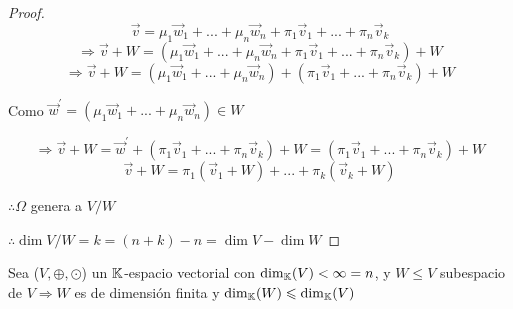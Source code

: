 \begin{proof}
    $$\vec{v} =  {\mu}_{1}\vec{w}_{1} + ... + {\mu}_{n}\vec{w}_{n}+ {\pi}_{1}\vec{v}_{1} + ... + {\pi}_{n}\vec{v}_{k}$$
    $$\Rightarrow \vec{v} + W = ({\mu}_{1}\vec{w}_{1} + ... + {\mu}_{n}\vec{w}_{n}+ {\pi}_{1}\vec{v}_{1} + ... + {\pi}_{n}\vec{v}_{k}) + W$$
    $$\Rightarrow \vec{v} + W = ({\mu}_{1}\vec{w}_{1} + ... + {\mu}_{n}\vec{w}_{n} )+ ({\pi}_{1}\vec{v}_{1} + ... + {\pi}_{n}\vec{v}_{k}) + W $$

    Como $\vec{w}^{\prime} = ({\mu}_{1}\vec{w}_{1} + ... + {\mu}_{n}\vec{w}_{n} ) \in W$

    $$\Rightarrow \vec{v} + W = \vec{w}^{\prime}  + ({\pi}_{1}\vec{v}_{1} + ... + {\pi}_{n}\vec{v}_{k}) + W  = ({\pi}_{1}\vec{v}_{1} + ... + {\pi}_{n}\vec{v}_{k}) + W$$
    $$ \vec{v} + W = {\pi}_{1}(\vec{v}_{1}+W) + ... + {\pi}_{k}(\vec{v}_{k}+W)$$

    $\therefore \Omega$ genera a $V / W$

    $\therefore \dim V / W = k = (n+k) - n = \dim V - \dim W$
\end{proof}

\begin{theorem} \label{tarea5og}
    Sea ($V, \oplus, \odot$) un $\mathbb{K}$-espacio vectorial con ${\dim}_{\mathbb{K}}(V) <  \infty = n$, y $W \leq V$ subespacio de $V \Rightarrow W$ es de dimensión finita y ${\dim}_{\mathbb{K}}(W) \leqslant {\dim}_{\mathbb{K}}(V)$
\end{theorem}

